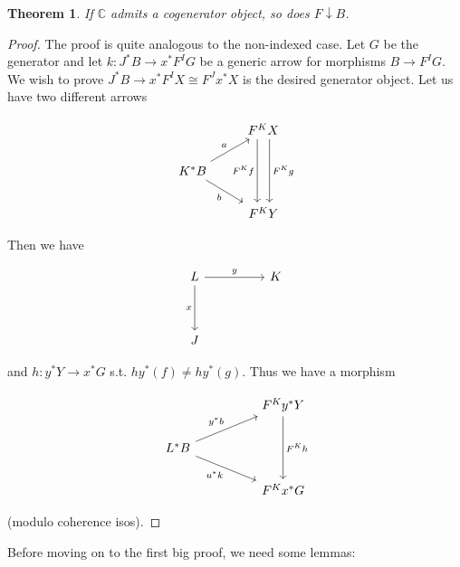 \documentclass[10pt, oneside]{article}
\newtheorem{theorem}{Theorem}[section]
\newtheorem{lemma}[theorem]{Lemma}
\begin{document}
\begin{comment}
\begin{lemma}
    Suppose $\mathbb{C}$ is $\mathcal{S}$-cocomplete and locally small. Then $G \in \mathcal{C}^I$ is a generator
\end{lemma}
\end{comment}

\begin{theorem}
    If $\mathbb{C}$ admits a cogenerator object, so does $F \downarrow B$.
\end{theorem}
\begin{proof}
    The proof is quite analogous to the non-indexed case. Let $G$ be the generator and let $k: J^\ast B \to x^\ast F^I G$ be a generic arrow for morphisms $B \to F^I G$. We wish to prove $J^\ast B \to x^\ast F^I X \cong F^J x^\ast X$ is the desired generator object. Let us have two different arrows

    \[\begin{tikzcd}[ampersand replacement=\&]
	\& {F^K X} \\
	{K^\ast B} \\
	\& {F^K Y}
	\arrow["a", from=2-1, to=1-2]
	\arrow["b"', from=2-1, to=3-2]
	\arrow["{F^K f}"', shift right=2, from=1-2, to=3-2]
	\arrow["{F^K g}", shift left=2, from=1-2, to=3-2]
\end{tikzcd}\]

Then we have

\[\begin{tikzcd}[ampersand replacement=\&]
	L \&\& K \\
	\\
	J
	\arrow["x"', from=1-1, to=3-1]
	\arrow["y", from=1-1, to=1-3]
\end{tikzcd}\]

and $h: y^\ast Y \to x^\ast G$ s.t. $h y^\ast (f) \neq h y^\ast (g)$. Thus we have a morphism

\[\begin{tikzcd}[ampersand replacement=\&]
	\&\& {F^K y^\ast Y} \\
	{L^\ast B} \\
	\&\& {F^K x^\ast G}
	\arrow["{y^\ast b}", from=2-1, to=1-3]
	\arrow["{F^K h}", from=1-3, to=3-3]
	\arrow["{u^\ast k}"', from=2-1, to=3-3]
\end{tikzcd}\]

\noindent (modulo coherence isos).

\end{proof}

Before moving on to the first big proof, we need some lemmas:
\end{document}
